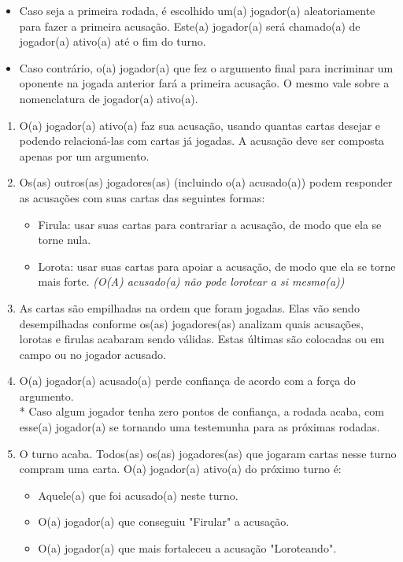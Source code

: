 \documentclass[a4paper, 11pt]{article}
\begin{document}
	\begin{itemize}
		\item Caso seja a primeira rodada, é escolhido um(a) jogador(a) aleatoriamente para fazer a primeira acusação. Este(a) jogador(a) será chamado(a) de jogador(a) ativo(a) até o fim do turno.

		\item Caso contrário, o(a) jogador(a) que fez o argumento final para incriminar um oponente na jogada anterior fará a primeira acusação. O mesmo vale sobre a nomenclatura de jogador(a) ativo(a).
	\end{itemize}

	\begin{enumerate}
		\item O(a) jogador(a) ativo(a) faz sua acusação, usando quantas cartas desejar e podendo relacioná-las com cartas já jogadas. A acusação deve ser composta apenas por um argumento.

		\item Os(as) outros(as) jogadores(as) (incluindo o(a) acusado(a)) podem responder as acusações com suas cartas das seguintes formas:
			\begin{itemize}
				\item Firula: usar suas cartas para contrariar a acusação, de modo que ela se torne nula.

				\item Lorota: usar suas cartas para apoiar a acusação, de modo que ela se torne mais forte. \textit{(O(A) acusado(a) não pode lorotear a si mesmo(a))}
			\end{itemize}

		\item As cartas são empilhadas na ordem que foram jogadas. Elas vão sendo desempilhadas conforme os(as) jogadores(as) analizam quais acusações, lorotas e firulas acabaram sendo válidas. Estas últimas são colocadas ou em campo ou no jogador acusado.

		\item O(a) jogador(a) acusado(a) perde confiança de acordo com a força do argumento. \\* Caso algum jogador tenha zero pontos de confiança, a rodada acaba, com esse(a) jogador(a) se tornando uma testemunha para as próximas rodadas.

		\item O turno acaba. Todos(as) os(as) jogadores(as) que jogaram cartas nesse turno compram uma carta. O(a) jogador(a) ativo(a) do próximo turno é:
			\begin{itemize}
				\item Aquele(a) que foi acusado(a) neste turno.

				\item O(a) jogador(a) que conseguiu "Firular" a acusação.

				\item O(a) jogador(a) que mais fortaleceu a acusação "Loroteando".
			\end{itemize}

	\end{enumerate}
\end{document}
